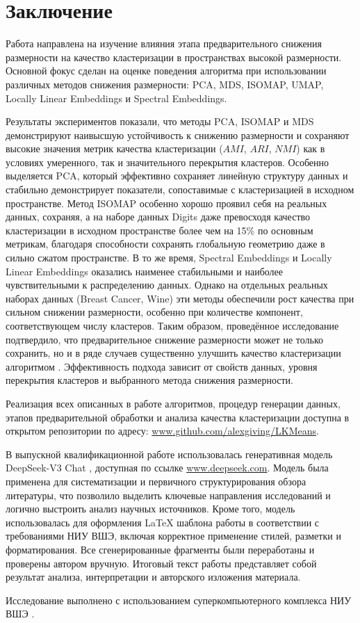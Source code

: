 \section{Заключение}
    Работа направлена на изучение влияния этапа предварительного снижения размерности на качество кластеризации в пространствах высокой размерности. Основной фокус сделан на оценке поведения алгоритма \kmeans{} при использовании различных методов снижения размерности: PCA, MDS, ISOMAP, UMAP, Locally Linear Embeddings и Spectral Embeddings.

    Результаты экспериментов показали, что методы PCA, ISOMAP и MDS демонстрируют наивысшую устойчивость к снижению размерности и сохраняют высокие значения метрик качества кластеризации (\(AMI\), \(ARI\), \(NMI\)) как в условиях умеренного, так и значительного перекрытия кластеров. Особенно выделяется PCA, который эффективно сохраняет линейную структуру данных и стабильно демонстрирует показатели, сопоставимые с кластеризацией в исходном пространстве. Метод ISOMAP особенно хорошо проявил себя на реальных данных, сохраняя, а на наборе данных Digits даже превосходя качество кластеризации в исходном пространстве более чем на 15\% по основным метрикам, благодаря способности сохранять глобальную геометрию даже в сильно сжатом пространстве. В то же время, Spectral Embeddings и Locally Linear Embeddings оказались наименее стабильными и наиболее чувствительными к распределению данных. Однако на отдельных реальных наборах данных (Breast Cancer, Wine) эти методы обеспечили рост качества при сильном снижении размерности, особенно при количестве компонент, соответствующем числу кластеров. Таким образом, проведённое исследование подтвердило, что предварительное снижение размерности может не только сохранить, но и в ряде случаев существенно улучшить качество кластеризации алгоритмом \kmeans{}. Эффективность подхода зависит от свойств данных, уровня перекрытия кластеров и выбранного метода снижения размерности.

    Реализация всех описанных в работе алгоритмов, процедур генерации данных, этапов предварительной обработки и анализа качества кластеризации доступна в открытом репозитории по адресу: \url{www.github.com/alexgiving/LKMeans}.

    В выпускной квалификационной работе использовалась генеративная модель DeepSeek-V3 Chat \cite{deepseekai2024deepseekv3technicalreport}, доступная по ссылке \url{www.deepseek.com}. Модель была применена для систематизации и первичного структурирования обзора литературы, что позволило выделить ключевые направления исследований и логично выстроить анализ научных источников. Кроме того, модель использовалась для оформления \LaTeX{} шаблона работы в соответствии с требованиями НИУ ВШЭ, включая корректное применение стилей, разметки и форматирования. Все сгенерированные фрагменты были переработаны и проверены автором вручную. Итоговый текст работы представляет собой результат анализа, интерпретации и авторского изложения материала.

    Исследование выполнено с использованием суперкомпьютерного комплекса НИУ ВШЭ \cite{charisma}.
